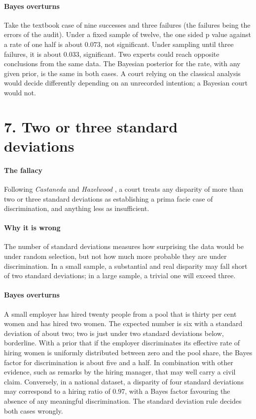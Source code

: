 \paragraph{Bayes overturns} Take the textbook case of nine successes and three failures (the failures being the errors of the audit). Under a fixed sample of twelve, the one sided p value against a rate of one half is about $0.073$, not significant. Under sampling until three failures, it is about $0.033$, significant. Two experts could reach opposite conclusions from the same data. The Bayesian posterior for the rate, with any given prior, is the same in both cases. A court relying on the classical analysis would decide differently depending on an unrecorded intention; a Bayesian court would not.

\section{7. Two or three standard deviations}

\paragraph{The fallacy} Following \emph{Castaneda} and \emph{Hazelwood} \citep{castaneda1977,hazelwood1977}, a court treats any disparity of more than two or three standard deviations as establishing a prima facie case of discrimination, and anything less as insufficient.

\paragraph{Why it is wrong} The number of standard deviations measures how surprising the data would be under random selection, but not how much more probable they are under discrimination. In a small sample, a substantial and real disparity may fall short of two standard deviations; in a large sample, a trivial one will exceed three.

\paragraph{Bayes overturns} A small employer has hired twenty people from a pool that is thirty per cent women and has hired two women. The expected number is six with a standard deviation of about two; two is just under two standard deviations below, borderline. With a prior that if the employer discriminates its effective rate of hiring women is uniformly distributed between zero and the pool share, the Bayes factor for discrimination is about five and a half. In combination with other evidence, such as remarks by the hiring manager, that may well carry a civil claim. Conversely, in a national dataset, a disparity of four standard deviations may correspond to a hiring ratio of $0.97$, with a Bayes factor favouring the absence of any meaningful discrimination. The standard deviation rule decides both cases wrongly.

